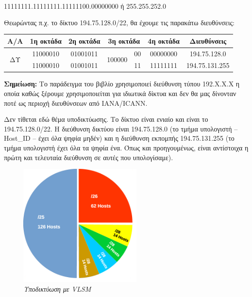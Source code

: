 11111111.11111111.11111100.00000000 ή 255.255.252.0

Θεωρώντας π.χ. το δίκτυο 194.75.128.0/22, θα έχουμε τις παρακάτω διευθύνσεις:

\begin{center}
\fontsize{10}{12}
\ttfamily
\begin{tabular}{|c|c|c|c|c|c|c|}
\hline
    Α/Α              & 1η οκτάδα & 2η οκτάδα & \multicolumn{2}{c|}{3η οκτάδα} & 4η οκτάδα & Διευθύνσεις \\ \hline
\multirow{2}{*}{ΔΥ} & 11000010  & 01001011 & \multirow{2}{*}{100000}  & 00 & 00000000 & 194.75.128.0 \\ \cline{2-3} \cline{5-7} 
                  & 11000010 & 01001011 &                    & 11 & 11111111 & 194.75.131.255 \\ \hline
\end{tabular}
\normalfont
\end{center}

\begin{inthebox}
\textbf{Σημείωση:} Το παράδειγμα του βιβλίο χρησιμοποιεί διεύθυνση τύπου 192.Χ.Χ.Χ η οποία καθώς ξέρουμε χρησιμοποιείται για ιδιωτικά δίκτυα και δεν θα μας δίνονταν ποτέ ως περιοχή διευθύνσεων από IANA/ICANN.\\
\end{inthebox}
 
Δεν τίθεται εδώ θέμα υποδικτύωσης. Το δίκτυο είναι ενιαίο και είναι το 194.75.128.0/22. Η διεύθυνση δικτύου είναι 194.75.128.0 (το τμήμα υπολογιστή -- Host\_ID -- έχει όλα ψηφία μηδέν) και η διεύθυνση εκπομπής 194.75.131.255 (το τμήμα υπολογιστή έχει όλα τα ψηφία ένα. Όπως και προηγουμένως, είναι αντίστοιχα η πρώτη και τελευταία διεύθυνση σε αυτές που υπολογίσαμε). 

\begin{figure}[!ht]
  \centering
  \includegraphics[width=0.55\textwidth]{images/chapter3/3-4}
  \caption {\textsl{Υποδικτύωση με VLSM}}
  \label{3-4}
\end{figure}


